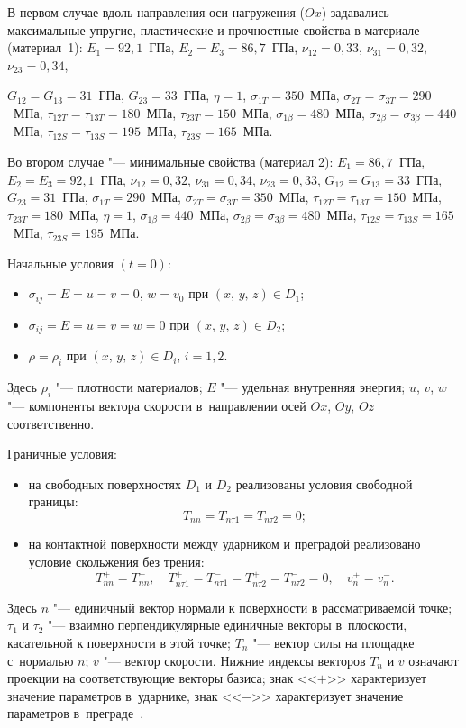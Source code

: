 В первом случае вдоль направления оси нагружения ($Ox$) задавались
максимальные упругие, пластические и прочностные свойства в материале
(материал~1): $E_1 = 92,1$~ГПа, $E_2 = E_3 = 86,7$~ГПа, $\nu _{12} = 0,33$,
\mbox{$\nu _{31} = 0,32$, $\nu _{23} = 0,34$,}

\noindent  $G_{12} = G_{13} = 31$~ГПа, $G_{23} =
33$~ГПа, $\eta = 1$, $\sigma _{1T} = 350$~МПа, $\sigma _{2T} = \sigma _{3T} =
290$~МПа, $\tau _{12T} = \tau _{13T} = 180$~МПа, $\tau _{23T} = 150$~МПа,
$\sigma _{1\beta } = 480$~МПа, $\sigma _{2\beta } = \sigma _{3\beta } =
440$~МПа, $\tau _{12S} = \tau _{13S} = 195$~МПа, $\tau _{23S} = 165$~МПа.

Во втором случае "--- минимальные свойства (материал 2): $E_1 = 86,7$~ГПа, $E_2
= E_3 = 92,1$~ГПа, $\nu _{12} = 0,32$, $\nu _{31} = 0,34$, $\nu _{23} =
0,33$, $G_{12} = G_{13} = 33$~ГПа, $G_{23} = 31$~ГПа, $\sigma _{1T} = 290$~МПа,
$\sigma _{2T} = \sigma _{3T} = 350$~МПа, $\tau _{12T} = \tau _{13T} =
150$~МПа, $\tau _{23T} = 180$~МПа, $\eta = 1$, $\sigma _{1\beta } =
440$~МПа, $\sigma _{2\beta } = \sigma _{3\beta } = 480$~МПа, $\tau _{12S} =
\tau _{13S} = 165$~МПа, $\tau _{23S} = 195$~МПа.



Начальные условия $(t = 0)$:
\begin{itemize}
\item $\sigma _{ij} = E = u = v  = 0$, $w = v  _0$ при $(x,\,y,\,z) \in D_1$;
\item $\sigma _{ij} = E = u = v  = w = 0$  при $(x,\,y,\,z) \in D_2$;
\item $\rho = \rho _i$ при $(x,\,y,\,z) \in D_i$, $i = 1, 2$.
\end{itemize}
Здесь $\rho _i $ "--- плотности материалов;
$E$ "--- удельная внутренняя энергия;
$u$, $v $, $w$ "--- компоненты вектора скорости в~направлении осей $Ox$, $Oy$, $Oz$ соответственно.

Граничные условия:
\begin{itemize}
\item на свободных поверхностях $D_1 $ и $D_2 $ реализованы условия свободной границы:
\[
T_{nn} = T_{n\tau 1} = T_{n\tau 2} = 0;
\]

\item на контактной поверхности между ударником и преградой реализовано условие
скольжения без трения:
\[
T_{nn}^ + = T_{nn}^ - ,\quad T_{n\tau 1}^ + = T_{n\tau 1}^ - = T_{n\tau 2}^ + = T_{n\tau 2}^ - = 0, \quad v  _n^ + = v  _n^ - .
\]
\end{itemize}
Здесь $n$ "--- единичный вектор нормали к поверхности в рассматриваемой точке;
$\tau _1 $ и $\tau _2 $ "--- взаимно перпендикулярные единичные векторы в~плоскости, касательной к поверхности в этой точке; $T_n $ "--- вектор силы на площадке с~нормалью $n$; 
$v  $ "--- вектор скорости. 
Нижние индексы векторов $T_n $ и $v  $ означают проекции на соответствующие векторы базиса; 
знак <<$+$>> характеризует значение параметров в~ударнике, знак <<$-$>> характеризует значение параметров в~преграде~\cite{tuch:bib5}.




